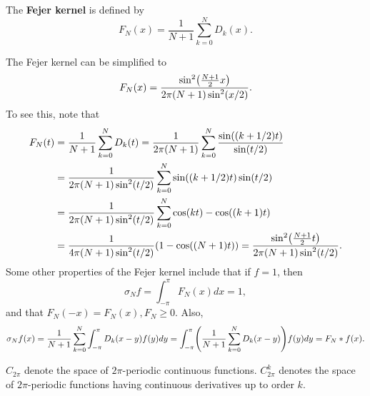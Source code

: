 \begin{definition}
    The \textbf{Fejer kernel} is defined by 
    \begin{equation*}
        F_N(x) = \frac{1}{N+1}\sum_{k=0}^N D_k(x).
    \end{equation*}
\end{definition}
\begin{remark}
    The Fejer kernel can be simplified to 
    \begin{equation*}
        F_N(x) = \frac{\sin^2\pth{\frac{N+1}{2}x}}{2\pi(N+1)\sin^2(x/2)}.
    \end{equation*}
    To see this, note that 
    \begin{equation*}
        \begin{split}
            F_N(t) &= \frac{1}{N+1}\sum_{k=0}^{N} D_k(t) 
            = \frac{1}{2\pi(N+1)}\sum_{k=0}^{N} \frac{\sin((k+1/2)t)}{\sin(t/2)} \\
            &= \frac{1}{2\pi(N+1)\sin^2(t/2)}\sum_{k=0}^{N} \sin((k+1/2)t)\sin(t/2) \\
            &= \frac{1}{2\pi(N+1)\sin^2(t/2)}\sum_{k=0}^{N} \cos(kt) - \cos((k+1)t) \\ 
            &= \frac{1}{4\pi(N+1)\sin^2(t/2)}\pth{1 - \cos((N+1)t)}
            = \frac{\sin^2\pth{\frac{N+1}{2}t}}{2\pi(N+1)\sin^2(t/2)}.
        \end{split}
    \end{equation*}
    Some other properties of the Fejer kernel include that if $f = 1$, then 
    \begin{equation*}
        \sigma_Nf = \int_{-\pi}^{\pi} F_N(x)dx = 1,
    \end{equation*}
    and that $F_N(-x) = F_N(x), F_N \geq 0$. Also, 
    \begin{equation*}
        \sigma_Nf(x) = \frac{1}{N+1}\sum_{k=0}^{N} \int_{-\pi}^\pi D_k(x-y)f(y)dy
        = \int_{-\pi}^\pi \pth{\frac{1}{N+1}\sum_{k=0}^{N}D_k(x-y)}f(y)dy
        = F_N*f(x).
    \end{equation*}
\end{remark}

\begin{definition}
    $C_{2\pi}$ denote the space of $2\pi$-periodic continuous functions. 
    $C^k_{2\pi}$ denotes the space of $2\pi$-periodic functions having continuous 
    derivatives up to order $k$.
\end{definition}

